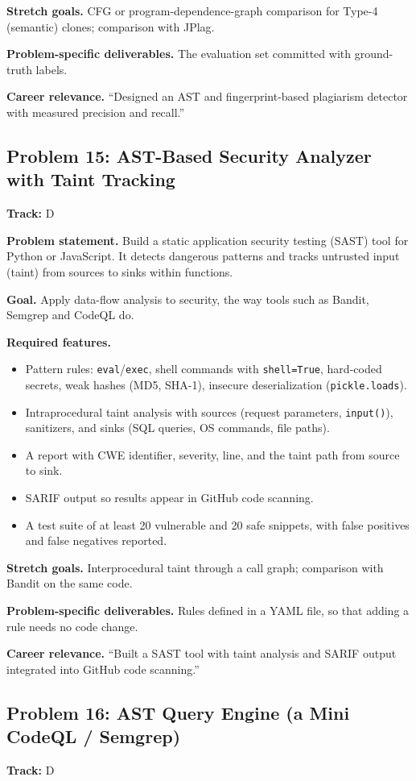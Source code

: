 \documentclass[11pt,a4paper]{article}
\newcommand{\fld}[1]{\par\smallskip\textbf{\color{accent}#1}\quad}
\newcommand{\meta}[1]{%
  \begin{tcolorbox}[colback=softbg,colframe=softbg,boxsep=2pt,left=4pt,right=4pt,top=2pt,bottom=2pt,arc=2pt]
  \small\textbf{Track:} #1
  \end{tcolorbox}}
\begin{document}
\fld{Stretch goals.} CFG or program-dependence-graph comparison for Type-4 (semantic) clones; comparison with JPlag.

\fld{Problem-specific deliverables.} The evaluation set committed with ground-truth labels.

\fld{Career relevance.} ``Designed an AST and fingerprint-based plagiarism detector with measured precision and recall.''

\subsection{Problem 15: AST-Based Security Analyzer with Taint Tracking}
\meta{D}

\fld{Problem statement.} Build a static application security testing (SAST) tool for Python or
JavaScript. It detects dangerous patterns and tracks untrusted input (taint) from sources to sinks
within functions.

\fld{Goal.} Apply data-flow analysis to security, the way tools such as Bandit, Semgrep and CodeQL do.

\fld{Required features.}
\begin{itemize}
  \item Pattern rules: \texttt{eval}/\texttt{exec}, shell commands with \texttt{shell=True}, hard-coded secrets, weak hashes (MD5, SHA-1), insecure deserialization (\texttt{pickle.loads}).
  \item Intraprocedural taint analysis with sources (request parameters, \texttt{input()}), sanitizers, and sinks (SQL queries, OS commands, file paths).
  \item A report with CWE identifier, severity, line, and the taint path from source to sink.
  \item SARIF output so results appear in GitHub code scanning.
  \item A test suite of at least 20 vulnerable and 20 safe snippets, with false positives and false negatives reported.
\end{itemize}

\fld{Stretch goals.} Interprocedural taint through a call graph; comparison with Bandit on the same code.

\fld{Problem-specific deliverables.} Rules defined in a YAML file, so that adding a rule needs no code change.

\fld{Career relevance.} ``Built a SAST tool with taint analysis and SARIF output integrated into GitHub code scanning.''

\subsection{Problem 16: AST Query Engine (a Mini CodeQL / Semgrep)}
\meta{D}
\end{document}
